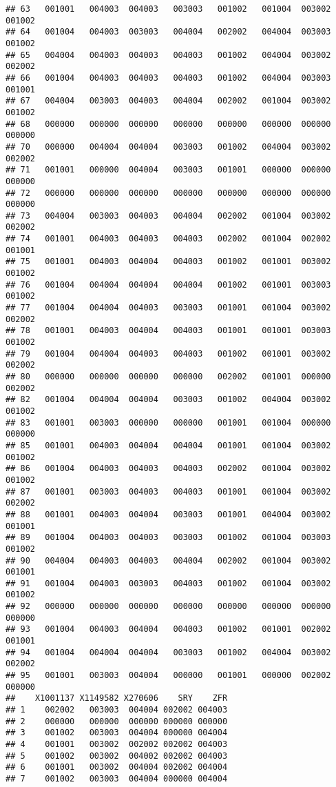 \documentclass[
]{article}
\begin{document}
\begin{verbatim}
## 63   001001   004003  004003   003003   001002   001004  003002  001002
## 64   001004   004003  003003   004004   002002   004004  003003  001002
## 65   004004   004003  004003   004003   001002   004004  003002  002002
## 66   001004   004003  004003   004003   001002   004004  003003  001001
## 67   004004   003003  004003   004004   002002   001004  003002  001002
## 68   000000   000000  000000   000000   000000   000000  000000  000000
## 70   000000   004004  004004   003003   001002   004004  003002  002002
## 71   001001   000000  004004   003003   001001   000000  000000  000000
## 72   000000   000000  000000   000000   000000   000000  000000  000000
## 73   004004   003003  004003   004004   002002   001004  003002  002002
## 74   001001   004003  004003   004003   002002   001004  002002  001001
## 75   001001   004003  004004   004003   001002   001001  003002  001002
## 76   001004   004004  004004   004004   001002   001001  003003  001002
## 77   001004   004004  004003   003003   001001   001004  003002  002002
## 78   001001   004003  004004   004003   001001   001001  003003  001002
## 79   001004   004004  004003   004003   001002   001001  003002  002002
## 80   000000   000000  000000   000000   002002   001001  000000  002002
## 82   001004   004004  004004   003003   001002   004004  003002  001002
## 83   001001   003003  000000   000000   001001   001004  000000  000000
## 85   001001   004003  004004   004004   001001   001004  003002  001002
## 86   001004   004003  004003   004003   002002   001004  003002  001002
## 87   001001   003003  004003   004003   001001   001004  003002  002002
## 88   001001   004003  004004   003003   001001   004004  003002  001001
## 89   001004   004003  004003   003003   001002   001004  003003  001002
## 90   004004   004003  004003   004004   002002   001004  003002  001001
## 91   001004   004003  003003   004003   001002   001004  003002  001002
## 92   000000   000000  000000   000000   000000   000000  000000  000000
## 93   001004   004003  004004   004003   001002   001001  002002  001001
## 94   001004   004004  004004   003003   001002   004004  003002  002002
## 95   001001   003003  004004   000000   001001   000000  002002  000000
##    X1001137 X1149582 X270606    SRY    ZFR
## 1    002002   003003  004004 002002 004003
## 2    000000   000000  000000 000000 000000
## 3    001002   003003  004004 000000 004004
## 4    001001   003002  002002 002002 004003
## 5    001002   003002  004002 002002 004003
## 6    001001   003002  004004 002002 004004
## 7    001002   003003  004004 000000 004004

\end{verbatim}
\end{document}
